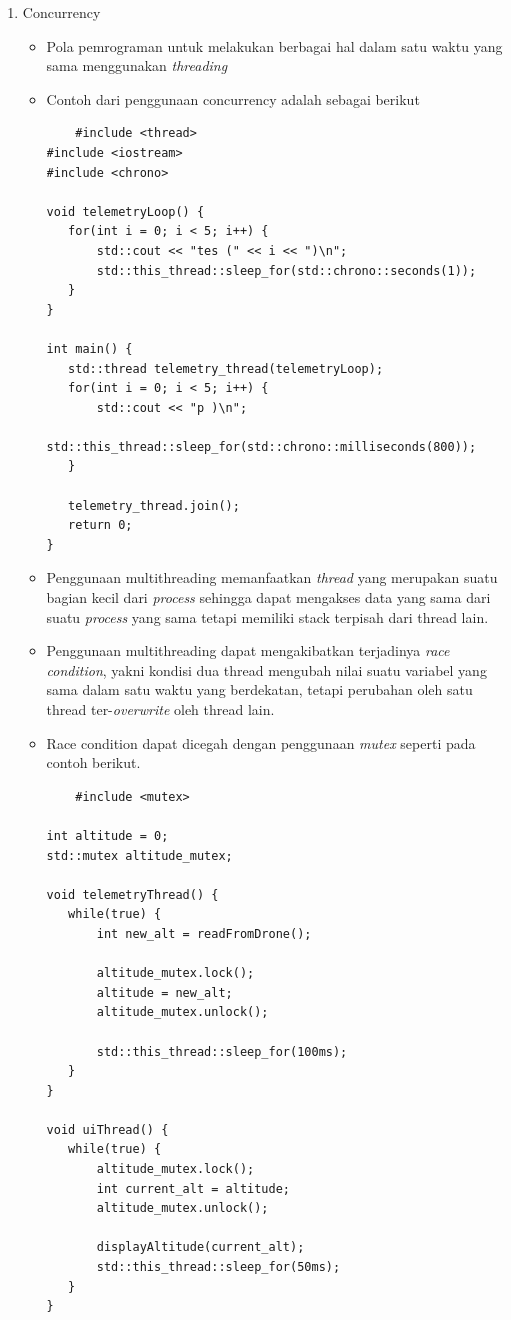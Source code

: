 \documentclass{article}
\begin{document}
\begin{enumerate}
\begin{enumerate}
        \item Concurrency 
        \begin{itemize}
            \item Pola pemrograman untuk melakukan berbagai hal dalam satu waktu yang sama menggunakan \emph{threading}
            \item Contoh dari penggunaan concurrency adalah sebagai berikut
\begin{verbatim}
    #include <thread>
#include <iostream>
#include <chrono>

void telemetryLoop() {
   for(int i = 0; i < 5; i++) {
       std::cout << "tes (" << i << ")\n";
       std::this_thread::sleep_for(std::chrono::seconds(1));
   }
}

int main() {
   std::thread telemetry_thread(telemetryLoop);   
   for(int i = 0; i < 5; i++) {
       std::cout << "p )\n";
       std::this_thread::sleep_for(std::chrono::milliseconds(800));
   }
  
   telemetry_thread.join();
   return 0;
}
\end{verbatim}
        \item Penggunaan multithreading memanfaatkan \emph{thread} yang merupakan suatu bagian kecil dari \emph{process} sehingga dapat mengakses data yang sama dari suatu \emph{process} yang sama tetapi memiliki stack terpisah dari thread lain.
        
        \item Penggunaan multithreading dapat mengakibatkan terjadinya \emph{race condition}, yakni kondisi dua thread mengubah nilai suatu variabel yang sama dalam satu waktu yang berdekatan, tetapi perubahan oleh satu thread ter-\emph{overwrite} oleh thread lain. 

        \item Race condition dapat dicegah dengan penggunaan \emph{mutex} seperti pada contoh berikut.
\begin{verbatim}
    #include <mutex>

int altitude = 0;
std::mutex altitude_mutex;

void telemetryThread() {
   while(true) {
       int new_alt = readFromDrone();
      
       altitude_mutex.lock();   
       altitude = new_alt;      
       altitude_mutex.unlock(); 
      
       std::this_thread::sleep_for(100ms);
   }
}

void uiThread() {
   while(true) {
       altitude_mutex.lock();   
       int current_alt = altitude;
       altitude_mutex.unlock(); 
      
       displayAltitude(current_alt);
       std::this_thread::sleep_for(50ms);
   }
}
\end{verbatim}
        \end{itemize}
        
        \end{enumerate}
    \end{enumerate}
\end{document}
